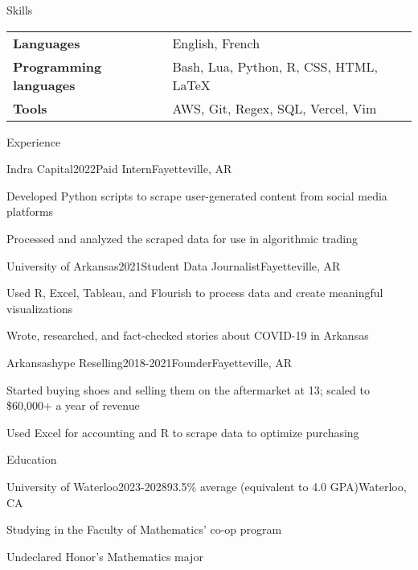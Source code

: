 \documentclass{resume}
\begin{document}
\begin{rSection}{Skills}\hfuzz=7pt
    \begin{tabular}{ @{} >{\bfseries}l R{14.41cm} l }
        Languages & English, French \\
        Programming languages & Bash, Lua, Python, R, CSS, HTML, \LaTeX \\
        Tools & AWS, Git, Regex, SQL, Vercel, Vim
    \end{tabular}
\end{rSection}

    \begin{rSection}{Experience}
        \begin{rSubsection}{Indra Capital}{2022}{Paid Intern}{Fayetteville, AR}
            \item Developed Python scripts to scrape user-generated content from social media platforms
            \item Processed and analyzed the scraped data for use in algorithmic trading
        \end{rSubsection}
        \begin{rSubsection}{University of Arkansas}{2021}{Student Data Journalist}{Fayetteville, AR}
            \item Used R, Excel, Tableau, and Flourish to process data and create meaningful visualizations
            \item Wrote, researched, and fact-checked stories about COVID-19 in Arkansas
        \end{rSubsection}
        \begin{rSubsection}{Arkansashype Reselling}{2018-2021}{Founder}{Fayetteville, AR}
            \item Started buying shoes and selling them on the aftermarket at 13; scaled to \$60,000+ a year of revenue
            \item Used Excel for accounting and R to scrape data to optimize purchasing
        \end{rSubsection}
    \end{rSection}
    \begin{rSection}{Education}
        \begin{rSubsection}{University of Waterloo}{2023-2028}{93.5\% average (equivalent to 4.0 GPA)}{Waterloo, CA}
            \item Studying in the Faculty of Mathematics' co-op program
            \item Undeclared Honor's Mathematics major
        \end{rSubsection}
    \end{rSection}
\end{document}
